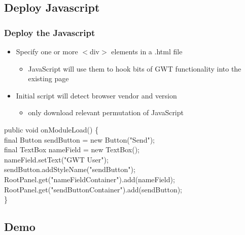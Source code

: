 \subsection{Deploy Javascript}
\begin{frame}[red] %
\frametitle{Deploy the Javascript}
\begin{itemize}
\item Specify one or more $<$div$>$ elements in a .html file
\begin{itemize}\item  JavaScript will use them to hook bits of GWT functionality into the existing page\end{itemize}

\item Initial script will detect browser vendor and version
\begin{itemize}\item  only download relevant permutation of JavaScript\end{itemize}


\end{itemize}
\vspace{1em}
\scriptsize{
public void onModuleLoad() \{\\
 \hspace{0.7em}   final Button sendButton = new Button("Send");\\
\hspace{0.7em}    final TextBox nameField = new TextBox();\\
\hspace{0.7em}    nameField.setText("GWT User");\\

\vspace{0.7em}\hspace{0.7em}   sendButton.addStyleName("sendButton");\\

\vspace{0.7em}\hspace{0.7em}   RootPanel.get("nameFieldContainer").add(nameField);\\
\hspace{0.7em}    RootPanel.get("sendButtonContainer").add(sendButton);\\
\}
}


\end{frame}




\subsection{Demo}

